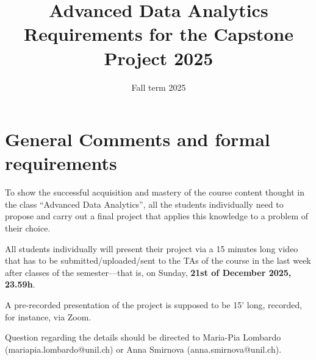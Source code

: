 \documentclass[12pt]{article} %
\title{Advanced Data Analytics \\ Requirements for the Capstone Project 2025}
\date{Fall term 2025}
\begin{document}

\maketitle


\section{General Comments and formal requirements}

To show the successful acquisition and mastery of the course content thought in the class
``Advanced Data Analytics'', all the students individually need to propose and carry out a final project
that applies this knowledge to a problem of their choice.

All students individually will present their project via a 15 minutes long video that has to be submitted/uploaded/sent to the TAs of the course in the last week after classes of the semester---that is, on Sunday, {\bf{21st of December 2025, 23.59h}}.


A pre-recorded presentation of the project is supposed to be 15' long, recorded, for instance, via Zoom. 

Question regarding the details should be directed to Maria-Pia Lombardo (mariapia.lombardo@unil.ch) or Anna Smirnova (anna.smirnova@unil.ch).
\end{document}
